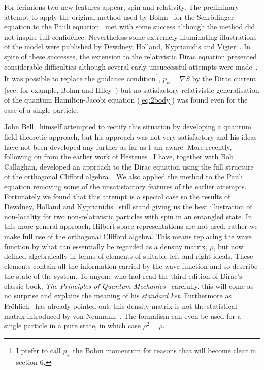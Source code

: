 \documentclass[11pt]{article}
\begin{document}
For ferimions two new features appear, spin and relativity.  The preliminary attempt to apply the original method used by Bohm~\cite{db52} for the Schr\"{o}dinger equation to the Pauli equation~\cite{bst55} met with some success although the method did not inspire full confidence. Nevertheless some extremely illuminating illustrations of the model were published by 
Dewdney, Holland, Kyprianidis and Vigier~\cite{cdphak87, cdphak88}. 
In spite of these successes, the extension to the relativistic Dirac equation presented considerable difficulties although several early unsuccessful attempts were made~\cite{db62, ldb60, ph95, dbbh93}.  It was possible to replace the guidance condition\footnote{I prefer to call $p_\psi$ the Bohm momentum for reasons that will become clear in section 6.}, $p_\psi=\nabla S$ by the Dirac current (see, for example, Bohm and Hiley~\cite{dbbh93}) but no satisfactory relativistic generalisation of the quantum Hamilton-Jacobi equation (\ref{eq:2body}) was found even for the case of a single particle.

John Bell~\cite{jb87} himself attempted to rectify this situation by developing a quantum field theoretic approach, 
but his approach was not very satisfactory and his ideas have not been developed any further as far as I am aware. More recently, following on from the earlier work of Hestenes~\cite{dh03}
 I have, together with Bob Callaghan, developed an  approach to the Dirac equation using the full structure of the orthogonal Clifford algebra~\cite{bhbc12, bhbc11}.  We also applied the method to the Pauli equation removing some of the unsatisfactory features of the earlier attempts.  Fortunately we found that this attempt is a special case  so the results of Dewdney, Holland and Kyprianidis~\cite{cdphak87} still stand giving us the best illustration of non-locality for two non-relativistic particles with spin in an entangled state.
In this more general approach,  Hilbert space representations are not used, rather we make full use of the orthogonal Clifford algebra.  This means replacing the wave function by what can  essentially be regarded as a density matrix, $\rho$, but now defined algebraically in terms of elements of suitable left and right ideals. These elements contain all the information carried by the wave function and so describe the state of the system.  To anyone who had read the third edition of Dirac's classic book, {\em The Principles of Quantum Mechanics}~\cite{pd47} 
carefully, this will come as no surprise and explains the meaning of his {\em standard ket}.  Furthermore as Fr\"{o}hlich~\cite{hf67} has already pointed out, this density matrix is not the statistical matrix introduced by von Neumann~\cite{vn55}.
The formalism can even be used for a single particle in a pure state, in which   case $\rho^2=\rho$.  
\end{document}

